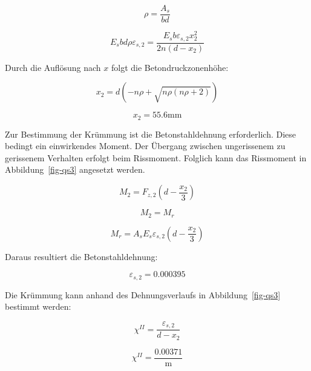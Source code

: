 \documentclass[
  letterpaper,
]{scrreprt}
\begin{document}
\begin{equation}\rho = \frac{A_{s}}{b d}\end{equation}

\begin{equation}E_{s} b d \rho \varepsilon_{s,2} = \frac{E_{s} b \varepsilon_{s,2} x_{2}^{2}}{2 n \left(d - x_{2}\right)}\end{equation}

Durch die Auflösung nach \(x\) folgt die Betondruckzonenhöhe:

\begin{equation}x_{2} = d \left(- n \rho + \sqrt{n \rho \left(n \rho + 2\right)}\right)\end{equation}

\begin{equation}x_{2} = 55.6 \text{mm}\end{equation}

Zur Bestimmung der Krümmung ist die Betonstahldehnung erforderlich.
Diese bedingt ein einwirkendes Moment. Der Übergang zwischen
ungerissenem zu gerissenem Verhalten erfolgt beim Rissmoment. Folglich
kann das Rissmoment in Abbildung~\ref{fig-qs3} angesetzt werden.

\begin{equation}M_{2} = F_{z,2} \left(d - \frac{x_{2}}{3}\right)\end{equation}

\begin{equation}M_{2} = M_{r}\end{equation}

\begin{equation}M_{r} = A_{s} E_{s} \varepsilon_{s,2} \left(d - \frac{x_{2}}{3}\right)\end{equation}

Daraus resultiert die Betonstahldehnung:

\begin{equation}\varepsilon_{s,2} = 0.000395\end{equation}

Die Krümmung kann anhand des Dehnungsverlaufs in Abbildung~\ref{fig-qs3}
bestimmt werden:

\begin{equation}\chi^{II} = \frac{\varepsilon_{s,2}}{d - x_{2}}\end{equation}

\begin{equation}\chi^{II} = \frac{0.00371}{\text{m}}\end{equation}
\end{document}
